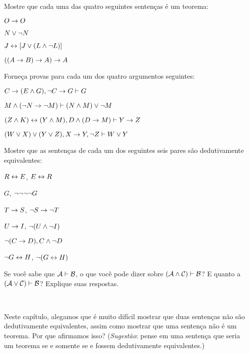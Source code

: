 \practiceproblems
\problempart
Mostre que cada uma das quatro seguintes senten\c cas \'e um teorema:
\begin{earg}
\item $O \rightarrow O$
\item $N \vee \neg N$
\item $J \leftrightarrow [J\vee (L\wedge\neg L)]$
\item $((A \rightarrow B) \rightarrow A) \rightarrow A$ 
\end{earg}

\problempart
Forne\c ca provas para cada um dos quatro argumentos seguintes:
\begin{earg}
\item $C\rightarrow(E\wedge G), \neg C \rightarrow G \vdash G$
\item $M \wedge (\neg N \rightarrow \neg M) \vdash (N \wedge M) \vee \neg M$
\item $(Z\wedge K)\leftrightarrow(Y\wedge M), D\wedge(D\rightarrow M) \vdash Y\rightarrow Z$
\item $(W \vee X) \vee (Y \vee Z), X\rightarrow Y, \neg Z \vdash W\vee Y$
\end{earg}

\problempart
Mostre que as sentenças de cada um dos seguintes seis pares são dedutivamente equivalentes:
\begin{earg}
\item $R \leftrightarrow E$, $E \leftrightarrow R$
\item $G$, $\neg\neg\neg\neg G$
\item $T\rightarrow S$, $\neg S \rightarrow \neg T$
\item $U \rightarrow I$, $\neg(U \wedge \neg I)$
\item $\neg (C \rightarrow D), C \wedge \neg D$
\item $\neg G \leftrightarrow H$, $\neg(G \leftrightarrow H)$ 
\end{earg}

\problempart
 Se voc\^e sabe que $\mathcal{A}\vdash\mathcal{B}$, o que voc\^e pode dizer sobre $(\mathcal{A}\wedge\mathcal{C})\vdash\mathcal{B}$? E quanto a $(\mathcal{A}\vee\mathcal{C})\vdash\mathcal{B}$? Explique suas respostas.

\

\problempart Neste cap\'itulo, alegamos que \'e muito dif\'icil mostrar que duas senten\c cas n\~ao s\~ao dedutivamente equivalentes, assim como mostrar que uma senten\c ca n\~ao \'e um teorema. Por que afirmamos isso? (\emph{Sugest\~ao}: pense em uma senten\c ca que seria um teorema se e somente se  e  fossem dedutivamente equivalentes.)

